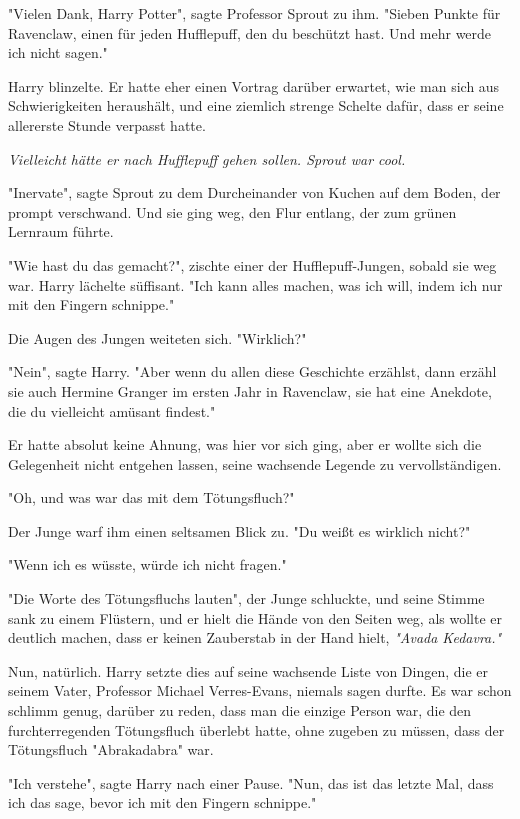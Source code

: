 {"Vielen Dank, Harry Potter", sagte Professor Sprout zu ihm. "Sieben Punkte für Ravenclaw, einen für jeden Hufflepuff, den du beschützt hast. Und mehr werde ich nicht sagen."

Harry blinzelte. Er hatte eher einen Vortrag darüber erwartet, wie man sich aus Schwierigkeiten heraushält, und eine ziemlich strenge Schelte dafür, dass er seine allererste Stunde verpasst hatte.

\emph{Vielleicht hätte er nach Hufflepuff gehen sollen. Sprout war cool.}

"Inervate", sagte Sprout zu dem Durcheinander von Kuchen auf dem Boden, der prompt verschwand. Und sie ging weg, den Flur entlang, der zum grünen Lernraum führte.

"Wie hast du das gemacht?", zischte einer der Hufflepuff-Jungen, sobald sie weg war. Harry lächelte süffisant. "Ich kann alles machen, was ich will, indem ich nur mit den Fingern schnippe."

Die Augen des Jungen weiteten sich. "Wirklich?"

"Nein", sagte Harry. "Aber wenn du allen diese Geschichte erzählst, dann erzähl sie auch Hermine Granger im ersten Jahr in Ravenclaw, sie hat eine Anekdote, die du vielleicht amüsant findest."

Er hatte absolut keine Ahnung, was hier vor sich ging, aber er wollte sich die Gelegenheit nicht entgehen lassen, seine wachsende Legende zu vervollständigen.

"Oh, und was war das mit dem Tötungsfluch?"

Der Junge warf ihm einen seltsamen Blick zu. "Du weißt es wirklich nicht?"

"Wenn ich es wüsste, würde ich nicht fragen."

"Die Worte des Tötungsfluchs lauten", der Junge schluckte, und seine Stimme sank zu einem Flüstern, und er hielt die Hände von den Seiten weg, als wollte er deutlich machen, dass er keinen Zauberstab in der Hand hielt, \emph{"Avada Kedavra."}

Nun, natürlich. Harry setzte dies auf seine wachsende Liste von Dingen, die er seinem Vater, Professor Michael Verres-Evans, niemals sagen durfte. Es war schon schlimm genug, darüber zu reden, dass man die einzige Person war, die den furchterregenden Tötungsfluch überlebt hatte, ohne zugeben zu müssen, dass der Tötungsfluch "Abrakadabra" war.

"Ich verstehe", sagte Harry nach einer Pause. "Nun, das ist das letzte Mal, dass ich das sage, bevor ich mit den Fingern schnippe."

}
